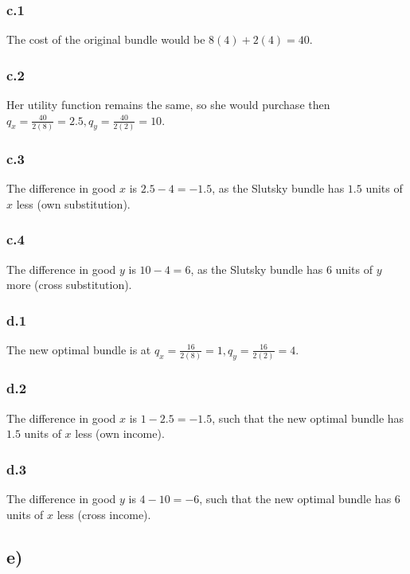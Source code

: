\documentclass[12pt,letterpaper]{article}
\theoremstyle{definition}
\begin{document}
\subsubsection*{c.1}

The cost of the original bundle would be $8(4) + 2(4) = 40$.

\subsubsection*{c.2}

Her utility function remains the same, so she would purchase then $q_x =
\frac{40}{2(8)} = 2.5, q_y = \frac{40}{2(2)} = 10$.

\subsubsection*{c.3}

The difference in good $x$ is $2.5 - 4 = -1.5$, as the Slutsky bundle has
$1.5$ units of $x$ less (own substitution).

\subsubsection*{c.4}

The difference in good $y$ is $10 - 4 = 6$, as the Slutsky bundle has
$6$ units of $y$ more (cross substitution).

\subsubsection*{d.1}

The new optimal bundle is at $q_x = \frac{16}{2(8)} = 1, q_y = \frac{16}{2(2)} =
  4$.

\subsubsection*{d.2}

The difference in good $x$ is $1 - 2.5 = -1.5$, such that the new optimal bundle
has $1.5$ units of $x$ less (own income).

\subsubsection*{d.3}

The difference in good $y$ is $4 - 10 = -6$, such that the new optimal bundle
has $6$ units of $x$ less (cross income).

\subsection*{e)}
\end{document}

